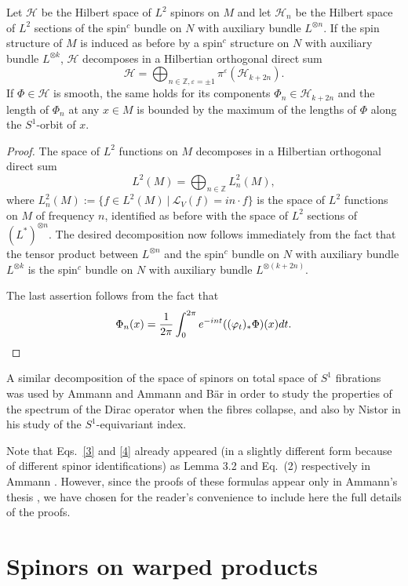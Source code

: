 \documentclass[12pt]{amsart}
\begin{document}
\begin{lemma}\label{desc}
Let ${\mathcal{H}}$ be the Hilbert space of $L^2$ spinors on $M$ and let ${\mathcal{H}}_n$
be the Hilbert space of $L^2$ sections of the  spin$^c$ bundle on $N$
with auxiliary bundle $L^{\otimes n}$.  
If the spin structure of $M$ is induced as before by a spin$^c$
structure on $N$ with auxiliary bundle $L^{\otimes k}$, ${\mathcal{H}}$
decomposes in a Hilbertian 
orthogonal direct sum 
$${\mathcal{H}}=\bigoplus_{n\in {{\mathbb Z}},{\varepsilon}=\pm1} \pi^{\varepsilon}({\mathcal{H}}_{k+2n}).$$
If $\Phi\in{\mathcal{H}}$ is smooth, the same holds for its components
$\Phi_n\in{\mathcal{H}}_{k+2n}$ and the length of $\Phi_n$ at any $x\in M$ is
bounded by the maximum of the lengths of $\Phi$ along the $S^1$-orbit
of $x$. 
\end{lemma}

\begin{proof}
The space of $L^2$ functions on $M$ decomposes in a Hilbertian
orthogonal direct sum  
$$L^2(M)=\bigoplus_{n\in {{\mathbb Z}}} L^2_n(M),$$
where $L^2_n(M):=\{f\in L^2(M)\ | \ {\mathcal{L}}_V(f)=in\cdot f\}$ is the space
of $L^2$ functions on $M$ of frequency $n$, identified as before with
the space of $L^2$ sections of $(L^*)^{\otimes n}$. The desired
decomposition now follows immediately from the fact that the tensor
product between $L^{\otimes n}$ and the spin$^c$ bundle on $N$ with
auxiliary bundle $L^{\otimes k}$ is the spin$^c$ bundle on $N$ with
auxiliary bundle $L^{\otimes (k+2n)}$.  

The last assertion follows from the fact that 
\[\Phi_n(x)=\frac1{2\pi}\int_0^{2\pi}e^{-int}(({\varphi}_t)_*\Phi)(x) dt.\qedhere\]
\end{proof}

A similar decomposition of the space of spinors on total space of $S^1$ 
fibrations was used by Ammann \cite{a} and Ammann and B\"ar \cite{ab}
in order to study the properties  
of the spectrum of the Dirac operator when the fibres collapse, 
and also by Nistor \cite{nistor} in his study of the $S^1$-equivariant index.

Note that Eqs.\ \eqref{3} and \eqref{4} already appeared (in a
slightly different form because of different spinor identifications)
as Lemma 3.2 and Eq.\ (2) respectively in Ammann \cite{a}. However,
since the proofs of these formulas appear only in Ammann's thesis
\cite{tha}, we have chosen for the reader's convenience to include
here the full details of the proofs.

\section{Spinors on warped products} \label{sect4}
\end{document}
